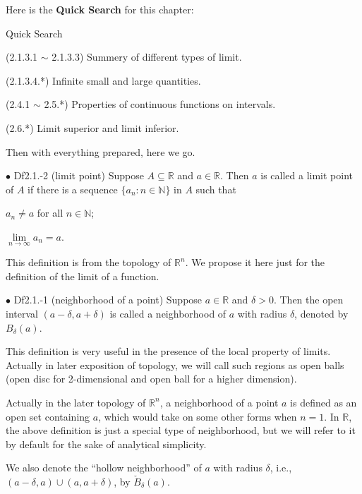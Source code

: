 \documentclass{article}
\begin{document}
Here is the \textbf{Quick Search} for this chapter:
\begin{Th}{Quick Search}
    \begin{compactdesc}
        \item[] (2.1.3.1 $\sim$ 2.1.3.3) Summery of different types of limit.
        \item[] (2.1.3.4.*) Infinite small and large quantities.
        \item[] (2.4.1 $\sim$ 2.5.*) Properties of continuous functions on intervals.
        \item[] (2.6.*) Limit superior and limit inferior.
    \end{compactdesc}
\end{Th}

Then with everything prepared, here we go.

\begin{Df}{$\bullet$ Df2.1.-2 (limit point)}
    Suppose $A\subseteq\mathbb{R}$ and $a\in\mathbb{R}$. Then $a$ is called a limit point of $A$ if there is a sequence $\{a_n:n\in\mathbb{N}\}$ in $A$ such that
    \begin{compactenum}
        \item $a_n\neq a$ for all $n\in\mathbb{N}$;
        \item $\lim\limits_{n\rightarrow\infty}a_n = a$.
    \end{compactenum}
\end{Df}

\begin{Rmk}{}
    This definition is from the topology of $\mathbb{R}^n$. We propose it here just for the definition of the limit of a function.
\end{Rmk}

\begin{Df}{$\bullet$ Df2.1.-1 (neighborhood of a point)}
    Suppose $a\in\mathbb{R}$ and $\delta>0$. Then the open interval $(a-\delta, a+\delta)$ is called a neighborhood of $a$ with radius $\delta$, denoted by $B_\delta(a)$.
\end{Df}

\begin{Rmk}{}
    \begin{compactitem}
        \item This definition is very useful in the presence of the local property of limits. Actually in later exposition of topology, we will call such regions as open balls (open disc for 2-dimensional and open ball for a higher dimension).
        \textcolor{Df}{\item Actually in the later topology of $\mathbb{R}^n$, a neighborhood of a point $a$ is defined as an open set containing $a$, which would take on some other forms when $n=1$. In $\mathbb{R}$, the above definition is just a special type of neighborhood, but we will refer to it by default for the sake of analytical simplicity. 
        \item We also denote the ``hollow neighborhood'' of $a$ with radius $\delta$, i.e., $(a-\delta, a)\cup(a, a+\delta)$, by $\check{B}_\delta(a)$.}
    \end{compactitem}
\end{Rmk}
\end{document}
